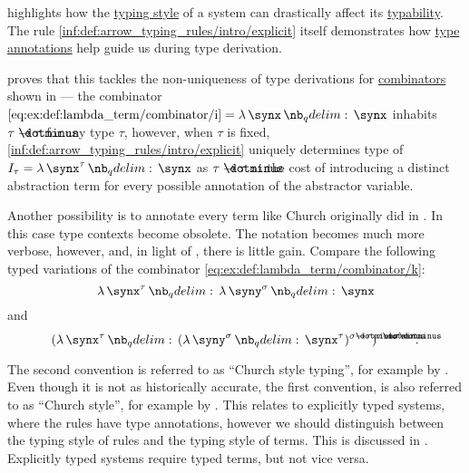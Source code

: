 \begin{remark}\label{rem:typing_style}
   highlights how the \hyperref[def:simple_type_system_style]{typing style} of a system can drastically affect its \hyperref[def:typability]{typability}. The rule \ref{inf:def:arrow_typing_rules/intro/explicit} itself demonstrates how \hyperref[con:type_annotation]{type annotations} help guide us during type derivation.

   proves that this tackles the non-uniqueness of type derivations for \hyperref[def:lambda_combinator]{combinators} shown in  --- the combinator \( \ref{eq:ex:def:lambda_term/combinator/i} = \qabs \synx \synx \) inhabits \( \tau \synimplies \tau \) for any type \( \tau \), however, when \( \tau \) is fixed, \ref{inf:def:arrow_typing_rules/intro/explicit} uniquely determines  type of \( I_\tau = \qabs {\synx^\tau} \synx \) as \( \tau \synimplies \tau \) at the cost of introducing a distinct abstraction term for every possible annotation of the abstractor variable.

  Another possibility is to annotate every term like Church originally did in \cite{Church1940STT}. In this case type contexts become obsolete. The notation becomes much more verbose, however, and, in light of , there is little gain. Compare the following typed variations of the combinator \ref{eq:ex:def:lambda_term/combinator/k}:
  \begin{equation*}
    \qabs {\synx^\tau} \qabs {\syny^\sigma} \synx
  \end{equation*}
  and
  \begin{equation*}
    (\qabs {\synx^\tau} (\qabs {\syny^\sigma} \synx^\tau)^{\sigma \synimplies \tau})^{\tau \synimplies \sigma \synimplies \tau}.
  \end{equation*}

  The second convention is referred to as \enquote{Church style typing}, for example by \cite[ch. 5]{Hindley1997BasicSTT}. Even though it is not as historically accurate, the first convention, is also referred to as \enquote{Church style}, for example by . This relates to explicitly typed systems, where the rules have type annotations, however we should distinguish between the typing style of rules and the typing style of terms. This is discussed in . Explicitly typed systems require typed terms, but not vice versa.


\end{remark}
